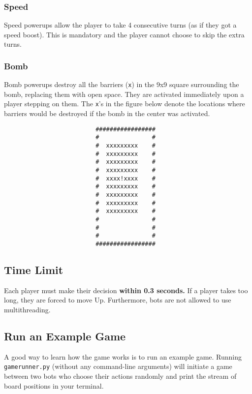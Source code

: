 \documentclass{article}
\begin{document}
    \subsubsection{Speed}
    Speed powerups allow the player to take 4 consecutive turns (as if they got a speed boost). This is mandatory and the player cannot choose to skip the extra turns.

    \subsubsection{Bomb}
    Bomb powerups destroy all the barriers (\texttt{x}) in the 9x9 square surrounding the bomb, replacing them with open space. They are activated immediately upon a player stepping on them. The \texttt{x}'s in the figure below denote the locations where barriers would be destroyed if the bomb in the center was activated.

    \begin{verbatim}
                          #################
                          #               #
                          #  xxxxxxxxx    #
                          #  xxxxxxxxx    #
                          #  xxxxxxxxx    #
                          #  xxxxxxxxx    #
                          #  xxxx!xxxx    #
                          #  xxxxxxxxx    #
                          #  xxxxxxxxx    #
                          #  xxxxxxxxx    #
                          #  xxxxxxxxx    #
                          #               #
                          #               #
                          #               #
                          #################

    \end{verbatim}

    \subsection{Time Limit}
    Each player must make their decision \textbf{within 0.3 seconds.}
    If a player takes too long, they are forced to move Up. Furthermore, bots are not allowed to use multithreading.

    \subsection{Run an Example Game}
    A good way to learn how the game works is to run an example game.
    Running \verb|gamerunner.py| (without any command-line arguments) will initiate a game between two bots who choose their actions randomly and print the stream of board positions in your terminal.
\end{document}
